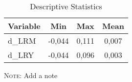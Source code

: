 \begin{table}[htbp]
\centering
\begin{threeparttable} 
\begin{tabular}{lccc}
\toprule
Variable & Min & Max & Mean\\ \hline
d\_LRM & -0,044 & 0,111 & 0,007\\ 
d\_LRY & -0,044 & 0,096 & 0,003\\ 
\bottomrule
\end{tabular}
\begin{tablenotes} 
\footnotesize 
\item \textsc{Note:} Add a note 
\end{tablenotes} 
\end{threeparttable} 
\caption{Descriptive Statistics}
\label{}
\end{table}
